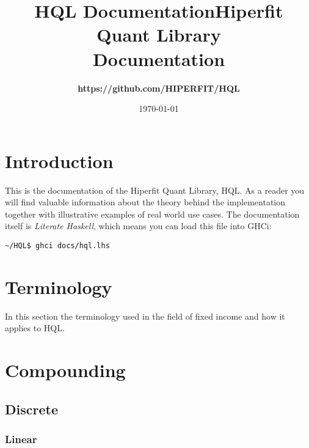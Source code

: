 \documentclass[11pt,a4paper]{article}
\def\Author{
\bf https://github.com/HIPERFIT/HQL
}
\def\Title{\bf Hiperfit Quant Library \\ Documentation}
\numberwithin{equation}{section}
\begin{document}
\title{HQL Documentation}

\title{\Title}
\author{\Author}
\date{\today}
\maketitle

\tableofcontents

\FrameSep

\section{Introduction}
This is the documentation of the Hiperfit Quant Library, HQL. As a reader you will
find valuable information about the theory behind the implementation together with
illustrative examples of real world use cases. The documentation itself is \textit{Literate Haskell}\cite{LitHaskell},
which means you can load this file into GHCi:

\FrameSep
\begin{lstlisting}
~/HQL$ ghci docs/hql.lhs
\end{lstlisting}

\section{Terminology}
In this section the terminology used in the field of fixed income and how it applies to HQL.


\section{Compounding}
\subsection{Discrete}
\subsubsection{Linear}
\end{document}
